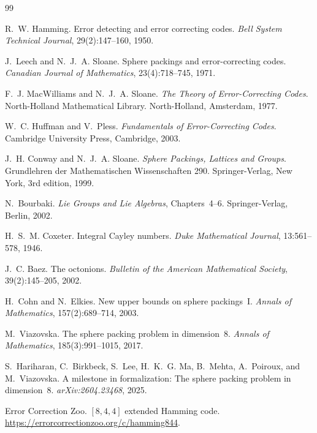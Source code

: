 \documentclass[12pt]{article}
\theoremstyle{definition}
\begin{document}

\begin{thebibliography}{99}

R.~W. Hamming.
\newblock Error detecting and error correcting codes.
\newblock \textit{Bell System Technical Journal}, 29(2):147--160, 1950.

J.~Leech and N.~J.~A. Sloane.
\newblock Sphere packings and error-correcting codes.
\newblock \textit{Canadian Journal of Mathematics}, 23(4):718--745, 1971.

F.~J. MacWilliams and N.~J.~A. Sloane.
\newblock \textit{The Theory of Error-Correcting Codes}.
\newblock North-Holland Mathematical Library. North-Holland, Amsterdam, 1977.

W.~C. Huffman and V.~Pless.
\newblock \textit{Fundamentals of Error-Correcting Codes}.
\newblock Cambridge University Press, Cambridge, 2003.

J.~H. Conway and N.~J.~A. Sloane.
\newblock \textit{Sphere Packings, Lattices and Groups}.
\newblock Grundlehren der Mathematischen Wissenschaften 290. Springer-Verlag,
  New York, 3rd edition, 1999.

N.~Bourbaki.
\newblock \textit{Lie Groups and Lie Algebras}, Chapters~4--6.
\newblock Springer-Verlag, Berlin, 2002.

H.~S.~M. Coxeter.
\newblock Integral {C}ayley numbers.
\newblock \textit{Duke Mathematical Journal}, 13:561--578, 1946.

J.~C. Baez.
\newblock The octonions.
\newblock \textit{Bulletin of the American Mathematical Society},
  39(2):145--205, 2002.

H.~Cohn and N.~Elkies.
\newblock New upper bounds on sphere packings~{I}.
\newblock \textit{Annals of Mathematics}, 157(2):689--714, 2003.

M.~Viazovska.
\newblock The sphere packing problem in dimension~8.
\newblock \textit{Annals of Mathematics}, 185(3):991--1015, 2017.

S.~Hariharan, C.~Birkbeck, S.~Lee, H.~K.~G. Ma, B.~Mehta, A.~Poiroux,
  and M.~Viazovska.
\newblock A milestone in formalization: The sphere packing problem in
  dimension~8.
\newblock \textit{arXiv:2604.23468}, 2025.

Error Correction Zoo.
\newblock $[8,4,4]$ extended {H}amming code.
\newblock \url{https://errorcorrectionzoo.org/c/hamming844}.

\end{thebibliography}
\end{document}
